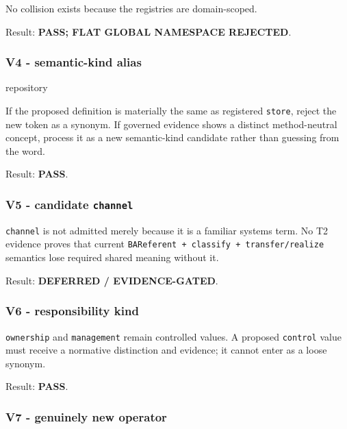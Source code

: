 \documentclass[
  10pt,
  a4paper,
]{article}
\newenvironment{Shaded}{}{}
\newcommand{\NormalTok}[1]{#1}
\begin{document}
No collision exists because the registries are domain-scoped.

Result: \textbf{PASS; FLAT GLOBAL NAMESPACE REJECTED}.

\subsubsection{V4 - semantic-kind alias}\label{v4---semantic-kind-alias}

\begin{Shaded}
\begin{Highlighting}[]
\NormalTok{repository}
\end{Highlighting}
\end{Shaded}

If the proposed definition is materially the same as registered
\texttt{store}, reject the new token as a synonym. If governed evidence
shows a distinct method-neutral concept, process it as a new
semantic-kind candidate rather than guessing from the word.

Result: \textbf{PASS}.

\subsubsection{\texorpdfstring{V5 - candidate
\texttt{channel}}{V5 - candidate channel}}\label{v5---candidate-channel}

\texttt{channel} is not admitted merely because it is a familiar systems
term. No T2 evidence proves that current
\texttt{BAReferent\ +\ classify\ +\ transfer/realize} semantics lose
required shared meaning without it.

Result: \textbf{DEFERRED / EVIDENCE-GATED}.

\subsubsection{V6 - responsibility kind}\label{v6---responsibility-kind}

\texttt{ownership} and \texttt{management} remain controlled values. A
proposed \texttt{control} value must receive a normative distinction and
evidence; it cannot enter as a loose synonym.

Result: \textbf{PASS}.

\subsubsection{V7 - genuinely new
operator}\label{v7---genuinely-new-operator}
\end{document}
